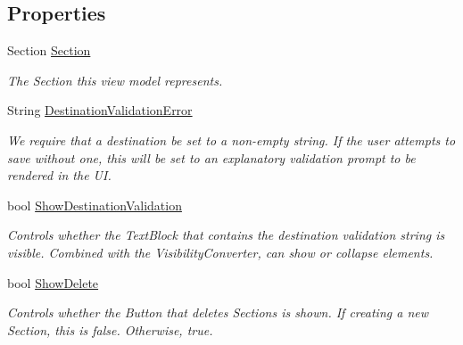 \subsection*{Properties}
\begin{DoxyCompactItemize}
\item 
Section \hyperlink{class_listen_to_me_1_1_view_model_1_1_section_view_model_ac1ac47e03f46b5fe9945f66cfbb03fa7}{Section}
\begin{DoxyCompactList}\small\item\em The Section this view model represents. \end{DoxyCompactList}\item 
String \hyperlink{class_listen_to_me_1_1_view_model_1_1_section_view_model_a6cd72ba0cad2236b996d642a70b22bfa}{Destination\+Validation\+Error}
\begin{DoxyCompactList}\small\item\em We require that a destination be set to a non-\/empty string. If the user attempts to save without one, this will be set to an explanatory validation prompt to be rendered in the UI. \end{DoxyCompactList}\item 
bool \hyperlink{class_listen_to_me_1_1_view_model_1_1_section_view_model_a82a97f1530d04dd2f88d29b886cc6593}{Show\+Destination\+Validation}
\begin{DoxyCompactList}\small\item\em Controls whether the Text\+Block that contains the destination validation string is visible. Combined with the Visibility\+Converter, can show or collapse elements. \end{DoxyCompactList}\item 
bool \hyperlink{class_listen_to_me_1_1_view_model_1_1_section_view_model_a24849a3722acd4b1d7d3bf227af05674}{Show\+Delete}
\begin{DoxyCompactList}\small\item\em Controls whether the Button that deletes Sections is shown. If creating a new Section, this is false. Otherwise, true. \end{DoxyCompactList}\end{DoxyCompactItemize}
